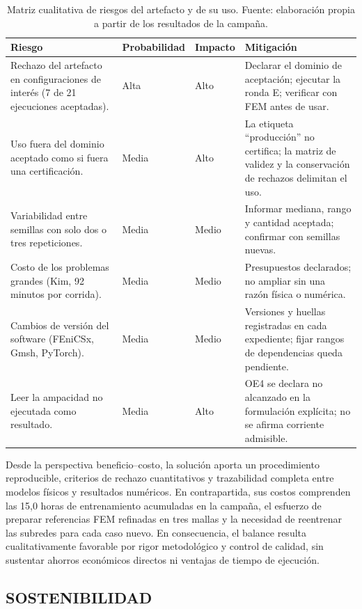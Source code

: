 \begin{table}[htbp]
\centering
\caption{Matriz cualitativa de riesgos del artefacto y de su uso. Fuente: elaboración propia a partir de los resultados de la campaña.}
\label{tab:matriz-riesgos}
\begin{tabularx}{\textwidth}{L{3.6cm}C{1.8cm}C{1.5cm}Y}
\toprule
Riesgo & Probabilidad & Impacto & Mitigación \\
\midrule
Rechazo del artefacto en configuraciones de interés (7 de 21 ejecuciones aceptadas). & Alta & Alto & Declarar el dominio de aceptación; ejecutar la ronda E; verificar con FEM antes de usar. \\
Uso fuera del dominio aceptado como si fuera una certificación. & Media & Alto & La etiqueta ``producción'' no certifica; la matriz de validez y la conservación de rechazos delimitan el uso. \\
Variabilidad entre semillas con solo dos o tres repeticiones. & Media & Medio & Informar mediana, rango y cantidad aceptada; confirmar con semillas nuevas. \\
Costo de los problemas grandes (Kim, 92 minutos por corrida). & Media & Medio & Presupuestos declarados; no ampliar sin una razón física o numérica. \\
Cambios de versión del software (FEniCSx, Gmsh, PyTorch). & Media & Medio & Versiones y huellas registradas en cada expediente; fijar rangos de dependencias queda pendiente. \\
Leer la ampacidad no ejecutada como resultado. & Media & Alto & OE4 se declara no alcanzado en la formulación explícita; no se afirma corriente admisible. \\
\bottomrule
\end{tabularx}
\end{table}

Desde la perspectiva beneficio--costo, la solución aporta un procedimiento reproducible, criterios de rechazo cuantitativos y trazabilidad completa entre modelos físicos y resultados numéricos. En contrapartida, sus costos comprenden las 15,0 horas de entrenamiento acumuladas en la campaña, el esfuerzo de preparar referencias FEM refinadas en tres mallas y la necesidad de reentrenar las subredes para cada caso nuevo. En consecuencia, el balance resulta cualitativamente favorable por rigor metodológico y control de calidad, sin sustentar ahorros económicos directos ni ventajas de tiempo de ejecución.

\subsection{SOSTENIBILIDAD}

